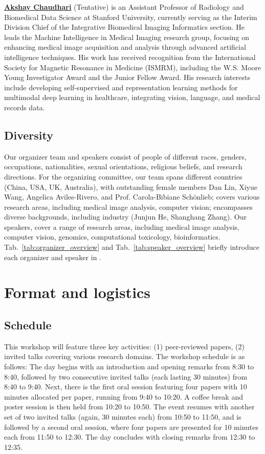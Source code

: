 \documentclass{article}
\begin{document}
\noindent
\textbf{\href{https://profiles.stanford.edu/akshay-chaudhari}{Akshay Chaudhari}} (Tentative) is an Assistant Professor of Radiology and Biomedical Data Science at Stanford University, currently serving as the Interim Division Chief of the Integrative Biomedical Imaging Informatics section. He leads the Machine Intelligence in Medical Imaging research group, focusing on enhancing medical image acquisition and analysis through advanced artificial intelligence techniques. His work has received recognition from the International Society for Magnetic Resonance in Medicine (ISMRM), including the W.S. Moore Young Investigator Award and the Junior Fellow Award.  His research interests include developing self-supervised and representation learning methods for multimodal deep learning in healthcare, integrating vision, language, and medical records data.



\subsection{Diversity}
Our organizer team and speakers consist of people of different races, genders, occupations, nationalities, sexual orientations, religious beliefs, and research directions. 
For the organizing committee, our team spans different countries (China, USA, UK, Australia), with outstanding female members Dan Lin, Xiyue Wang, Angelica Aviles-Rivero, and Prof. Carola-Bibiane Schönlieb; covers various research areas, including medical image analysis, computer vision; encompasses diverse backgrounds, including industry (Junjun He, Shanghang Zhang). 
%
Our speakers, cover a range of research areas, including medical image analysis, computer vision, genomics, computational toxicology, bioinformatics. Tab.~\ref{tab:organizer_overview} and Tab.~\ref{tab:speaker_overview} briefly introduce each organizer and speaker in .


\section{Format and logistics}
\subsection{Schedule}
This workshop will feature three key activities: (1) peer-reviewed papers, (2) invited talks covering various research domains.
%
The workshop schedule is as follows: The day begins with an introduction and opening remarks from 8:30 to 8:40, followed by two consecutive invited talks (each lasting 30 minutes) from 8:40 to 9:40. Next, there is the first oral session featuring four papers with 10 minutes allocated per paper, running from 9:40 to 10:20. A coffee break and poster session is then held from 10:20 to 10:50. The event resumes with another set of two invited talks (again, 30 minutes each) from 10:50 to 11:50, and is followed by a second oral session, where four papers are presented for 10 minutes each from 11:50 to 12:30. The day concludes with closing remarks from 12:30 to 12:35.
\end{document}
